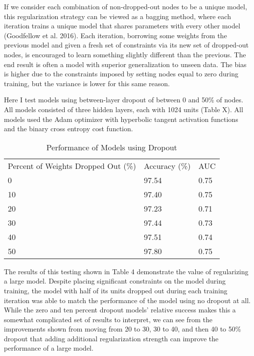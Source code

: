 \documentclass[12pt]{article}  %
\theoremstyle{definition}
\theoremstyle{remark}
\begin{document}
\par If we consider each combination of non-dropped-out nodes to be a unique model, this regularization strategy can be viewed as a bagging method, where each iteration trains a unique model that shares parameters with every other model (Goodfellow et al. 2016). Each iteration, borrowing some weights from the previous model and given a fresh set of constraints via its new set of dropped-out nodes, is encouraged to learn something slightly different than the previous. The end result is often a model with superior generalization to unseen data. The bias is higher due to the constraints imposed by setting nodes equal to zero during training, but the variance is lower for this same reason. 

\par Here I test models using between-layer dropout of between 0 and 50\% of nodes. All models consisted of three hidden layers, each with 1024 units (Table X). All models used the Adam optimizer with hyperbolic tangent activation functions and the binary cross entropy cost function.

\begin{table}[]
\centering
\caption{Performance of Models using Dropout}
\label{my-label}
\begin{tabular}{lll}
Percent of Weights Dropped Out (\%) & Accuracy (\%) & AUC  \\
0                                   & 97.54         & 0.75 \\
10                                  & 97.40         & 0.75 \\
20                                  & 97.23         & 0.71 \\
30                                  & 97.44         & 0.73 \\
40                                  & 97.51         & 0.74 \\
50                                  & 97.80         & 0.75
\end{tabular}
\end{table}


\par The results of this testing shown in Table 4 demonstrate the value of regularizing a large model. Despite placing significant constraints on the model during training, the model with half of its units dropped out during each training iteration was able to match the performance of the model using no dropout at all. While the zero and ten percent dropout models' relative success makes this a somewhat complicated set of results to interpret, we can see from the improvements shown from moving from 20 to 30, 30 to 40, and then 40 to 50\% dropout that adding additional regularization strength can improve the performance of a large model. 
\end{document}
